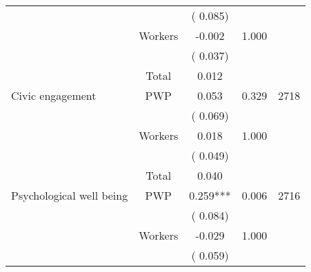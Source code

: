 \begin{tabular}{l*{4}{c}}
                               &                               &       (       0.085)                     & &                                                                             \\ 
                               &       Workers         &             -0.002               &        1.000   &                                               \\ 
                               &                               &       (       0.037)                     & &                                                                             \\ 
\cmidrule{2-3}
                               &       Total           &              0.012                 &    &                                               \\ 
\cmidrule{2-3}
 Civic engagement                 &       PWP     &              0.053               &        0.329   & 2718                              \\ 
                               &                               &       (       0.069)                     & &                                                                             \\ 
                               &       Workers         &              0.018               &        1.000   &                                               \\ 
                               &                               &       (       0.049)                     & &                                                                             \\ 
\cmidrule{2-3}
                               &       Total           &              0.040                 &    &                                               \\ 
\cmidrule{2-3}
 Psychological well being                &       PWP     &              0.259***               &       0.006    & 2716                              \\ 
                               &                               &       (       0.084)                     & &                                                                             \\ 
                               &       Workers         &             -0.029               &        1.000   &                                               \\ 
                               &                               &       (       0.059)                     & &                                                                             \\ 

\end{tabular}
